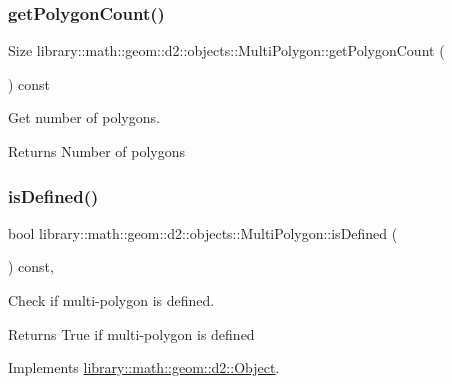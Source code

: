 \subsubsection{\texorpdfstring{get\+Polygon\+Count()}{getPolygonCount()}}
{\footnotesize\ttfamily Size library\+::math\+::geom\+::d2\+::objects\+::\+Multi\+Polygon\+::get\+Polygon\+Count (\begin{DoxyParamCaption}{ }\end{DoxyParamCaption}) const}



Get number of polygons. 

\begin{DoxyReturn}{Returns}
Number of polygons 
\end{DoxyReturn}
\mbox{\label{classlibrary_1_1math_1_1geom_1_1d2_1_1objects_1_1_multi_polygon_a9afa806e12102255fc5abf8a94106089}} 
\subsubsection{\texorpdfstring{is\+Defined()}{isDefined()}}
{\footnotesize\ttfamily bool library\+::math\+::geom\+::d2\+::objects\+::\+Multi\+Polygon\+::is\+Defined (\begin{DoxyParamCaption}{ }\end{DoxyParamCaption}) const\hspace{0.3cm}{\ttfamily [override]}, {\ttfamily [virtual]}}



Check if multi-\/polygon is defined. 

\begin{DoxyReturn}{Returns}
True if multi-\/polygon is defined 
\end{DoxyReturn}


Implements \hyperlink{classlibrary_1_1math_1_1geom_1_1d2_1_1_object_ae9506254971168a3ca63e1923556b70d}{library\+::math\+::geom\+::d2\+::\+Object}.

\mbox{\label{classlibrary_1_1math_1_1geom_1_1d2_1_1objects_1_1_multi_polygon_a7478631c89b146b6dcd4814a521c0200}} 
